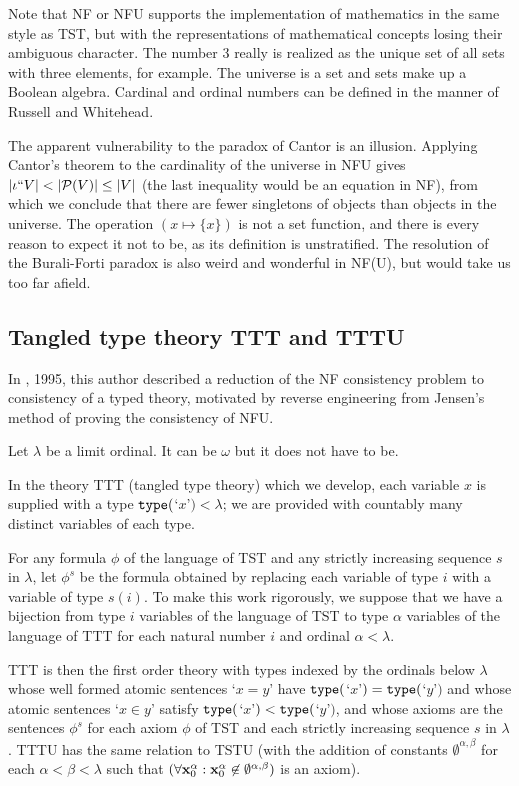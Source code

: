 \documentclass[112pt]{article}
\begin{document}
Note that NF or NFU supports the implementation of mathematics in the same style as TST, but with the representations of mathematical concepts losing their ambiguous character.  The number 3 really is realized as the unique set of all sets with three elements, for example.  The universe is a set and sets make up a Boolean algebra.   Cardinal and ordinal numbers can be defined
in the manner of Russell and Whitehead.

The apparent vulnerability to the paradox of Cantor is an illusion.  Applying Cantor's theorem to the cardinality of the universe in NFU gives $|\iota``V| < |{\cal P}(V)| \leq |V|$ (the last inequality would be an equation in NF), from which we conclude that there are fewer singletons of objects than objects in the universe.  The operation $(x \mapsto \{x\})$ is not a set function, and there is every reason to expect it not to be, as its definition is unstratified.  The resolution of the Burali-Forti paradox is also weird and wonderful in NF(U), but would take us too far afield.

\newpage

\subsection{Tangled type theory TTT and TTTU}

In \cite{tangled}, 1995, this author described a reduction of the NF consistency problem to consistency of a typed theory,  motivated by reverse engineering from Jensen's method of proving the consistency of NFU.

Let $\lambda$ be a limit ordinal.  It can be $\omega$ but it does not have to be.  

In the theory TTT (tangled type theory) which we develop, each variable $x$ is supplied with a type ${\tt type}($`$x$'$) <\lambda$;  we are provided with countably many distinct variables of each type.

For any formula $\phi$ of the language of TST and any strictly increasing sequence $s$ in $\lambda$, let $\phi^s$ be the formula obtained by replacing each variable
of type $i$ with a variable of type $s(i)$.  To make this work rigorously, we suppose that we have a bijection from type $i$ variables of the language of TST to type $\alpha$ variables
of the language of TTT for each natural number $i$ and ordinal $\alpha<\lambda$.

TTT is then the first order theory with types indexed by the ordinals below $\lambda$ whose well formed atomic sentences `$x=y$' have ${\tt type}($`$x$'$) = {\tt type}($`$y$'$)$ and whose atomic sentences `$x \in y$' satisfy ${\tt type}($`$x$'$) < {\tt type}($`$y$'$)$, and whose axioms are the sentences $\phi^s$ for each axiom $\phi$ of TST and each strictly increasing sequence $s$ in $\lambda$.  TTTU has the same relation to TSTU (with the addition of constants $\emptyset^{\alpha,\beta}$ for each $\alpha<\beta<\lambda$  such that $(\forall {\bf x}_0^{\alpha} :{\bf x}_0^{\alpha}\not\in \emptyset^{\alpha,\beta})$ is an axiom).
\end{document}
